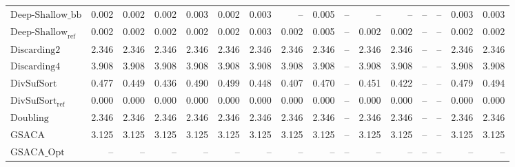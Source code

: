 \begin{table}[h]
{\begin{tabular}{lrrrrrrrrrrrrrrr}
    $\text{Deep-Shallow\_bb}$ & 0.002 & 0.002 & 0.002 & 0.003 & 0.002 & 0.003 & {\color{darkgray}--} & 0.005 & {\color{darkgray}--} & {\color{darkgray}--} & {\color{darkgray}--} & {\color{darkgray}--} & {\color{darkgray}--} & 0.003 & 0.003 \\
    $\text{Deep-Shallow}_{\text{ref}}$ & 0.002 & 0.002 & 0.002 & 0.002 & 0.002 & 0.003 & 0.002 & 0.005 & {\color{darkgray}--} & {\color{green!60!black}0.002} & 0.002 & {\color{darkgray}--} & {\color{darkgray}--} & 0.002 & 0.002 \\
    $\text{Discarding2}$ & 2.346 & 2.346 & 2.346 & 2.346 & 2.346 & 2.346 & 2.346 & 2.346 & {\color{darkgray}--} & 2.346 & 2.346 & {\color{darkgray}--} & {\color{darkgray}--} & 2.346 & 2.346 \\
    $\text{Discarding4}$ & {\color{red}3.908} & {\color{red}3.908} & {\color{red}3.908} & {\color{red}3.908} & {\color{red}3.908} & {\color{red}3.908} & {\color{red}3.908} & {\color{red}3.908} & {\color{darkgray}--} & {\color{red}3.908} & {\color{red}3.908} & {\color{darkgray}--} & {\color{darkgray}--} & {\color{red}3.908} & {\color{red}3.908} \\
    $\text{DivSufSort}$ & 0.477 & 0.449 & 0.436 & 0.490 & 0.499 & 0.448 & 0.407 & 0.470 & {\color{darkgray}--} & 0.451 & 0.422 & {\color{darkgray}--} & {\color{darkgray}--} & 0.479 & 0.494 \\
    $\text{DivSufSort}_{\text{ref}}$ & {\color{green!60!black}0.000} & 0.000 & 0.000 & {\color{green!60!black}0.000} & {\color{green!60!black}0.000} & {\color{green!60!black}0.000} & {\color{green!60!black}0.000} & {\color{green!60!black}0.000} & {\color{darkgray}--} & {\color{green!60!black}0.000} & {\color{green!60!black}0.000} & {\color{darkgray}--} & {\color{darkgray}--} & {\color{green!60!black}0.000} & {\color{green!60!black}0.000} \\
    $\text{Doubling}$ & 2.346 & 2.346 & 2.346 & 2.346 & 2.346 & 2.346 & 2.346 & 2.346 & {\color{darkgray}--} & 2.346 & 2.346 & {\color{darkgray}--} & {\color{darkgray}--} & 2.346 & 2.346 \\
    $\text{GSACA}$ & 3.125 & 3.125 & 3.125 & 3.125 & 3.125 & 3.125 & 3.125 & 3.125 & {\color{darkgray}--} & 3.125 & 3.125 & {\color{darkgray}--} & {\color{darkgray}--} & 3.125 & 3.125 \\
    $\text{GSACA\_Opt}$ & {\color{darkgray}--} & {\color{darkgray}--} & {\color{darkgray}--} & {\color{darkgray}--} & {\color{darkgray}--} & {\color{darkgray}--} & {\color{darkgray}--} & {\color{darkgray}--} & {\color{darkgray}--} & {\color{darkgray}--} & {\color{darkgray}--} & {\color{darkgray}--} & {\color{darkgray}--} & {\color{darkgray}--} & {\color{darkgray}--} \\

\end{tabular}}
\end{table}
